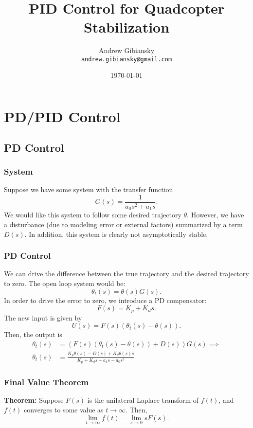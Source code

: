 \documentclass{beamer}
\title{PID Control for Quadcopter Stabilization}
\author{Andrew Gibiansky \\ \texttt{andrew.gibiansky@gmail.com}}
\date{\today}
\begin{document}
\begin{frame}
    \titlepage
\end{frame}

\section{PD/PID Control}
\subsection{PD Control}
\begin{frame}
    \frametitle{System}
    Suppose we have some system with the transfer function
    \[G(s) = \frac{1}{a_0s^2+a_1s}.\]
    We would like this system to follow some desired trajectory $\theta$. However, 
    we have a disturbance (due to modeling error or external factors) summarized by a
    term $D(s)$. In addition, this system is clearly not asymptotically stable.
\end{frame}

\begin{frame}
    \frametitle{PD Control}
    We can drive the difference between the true trajectory and the desired trajectory to zero. The
    open loop system would be:
    \[\theta_t(s) = \theta(s) G(s).\]
    In order to drive the error to zero, we introduce a PD compensator:
    \[F(s) = K_p + K_d s.\]
    The new input is given by
    \[U(s) = F(s) (\theta_t(s) - \theta(s)).\]
    Then, the output is
    \begin{align*}
        \theta_t(s) &= (F(s) (\theta_t(s) - \theta(s)) + D(s)) G(s) \implies \\
        \theta_t(s) &= \frac{K_p\theta(s) - D(s) + K_d\theta(s)s}{K_p + K_ds - a_1s - a_0s^2}
    \end{align*}
\end{frame}

\begin{frame}
    \frametitle{Final Value Theorem}
    \textbf{Theorem:} Suppose $F(s)$ is the unilateral Laplace transform of $f(t)$, and $f(t)$
    converges to some value as $t \to \infty$. Then,
    \[\lim_{t\to\infty} f(t) = \lim_{s\to 0} sF(s).\]
\end{frame}
\end{document}
